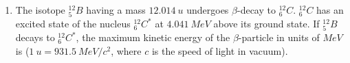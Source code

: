 
\begin{enumerate}
    \item The isotope $^{12}_{5}B$ having a mass $12.014 \ u$ undergoes $\beta$-decay to $^{12}_{6}C$. $^{12}_{6}C$ has an excited state of the nucleus $^{12}_{6}C^*$ at $4.041 \ MeV$ above its ground state. If $^{12}_{5}B$ decays to $^{12}_{6}C^*$, the maximum kinetic energy of the $\beta$-particle in units of $MeV$ is \underline{\hspace{2.5 cm}} ($1 \ u = 931.5 \ MeV/c^2$, where $c$ is the speed of light in vacuum).
\end{enumerate}
